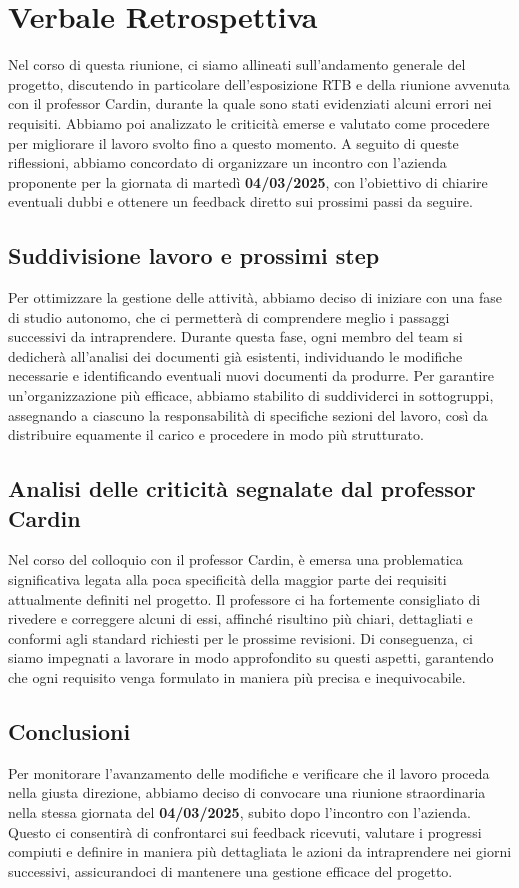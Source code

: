 \documentclass{article}
\begin{document}
\newpage
\section{Verbale Retrospettiva}
Nel corso di questa riunione, ci siamo allineati sull'andamento generale del progetto, discutendo in particolare dell'esposizione RTB e della riunione avvenuta con il professor Cardin, durante la quale sono stati evidenziati alcuni errori nei requisiti. Abbiamo poi analizzato le criticità emerse e valutato come procedere per migliorare il lavoro svolto fino a questo momento. A seguito di queste riflessioni, abbiamo concordato di organizzare un incontro con l'azienda proponente per la giornata di martedì \textbf{04/03/2025}, con l'obiettivo di chiarire eventuali dubbi e ottenere un feedback diretto sui prossimi passi da seguire.
\subsection{Suddivisione lavoro e prossimi step}
Per ottimizzare la gestione delle attività, abbiamo deciso di iniziare con una fase di studio autonomo, che ci permetterà di comprendere meglio i passaggi successivi da intraprendere. Durante questa fase, ogni membro del team si dedicherà all'analisi dei documenti già esistenti, individuando le modifiche necessarie e identificando eventuali nuovi documenti da produrre. Per garantire un'organizzazione più efficace, abbiamo stabilito di suddividerci in sottogruppi, assegnando a ciascuno la responsabilità di specifiche sezioni del lavoro, così da distribuire equamente il carico e procedere in modo più strutturato.
\subsection{Analisi delle criticità segnalate dal professor Cardin}
Nel corso del colloquio con il professor Cardin, è emersa una problematica significativa legata alla poca specificità della maggior parte dei requisiti attualmente definiti nel progetto. Il professore ci ha fortemente consigliato di rivedere e correggere alcuni di essi, affinché risultino più chiari, dettagliati e conformi agli standard richiesti per le prossime revisioni. Di conseguenza, ci siamo impegnati a lavorare in modo approfondito su questi aspetti, garantendo che ogni requisito venga formulato in maniera più precisa e inequivocabile.
\subsection{Conclusioni}
Per monitorare l'avanzamento delle modifiche e verificare che il lavoro proceda nella giusta direzione, abbiamo deciso di convocare una riunione straordinaria nella stessa giornata del \textbf{04/03/2025}, subito dopo l'incontro con l'azienda. Questo ci consentirà di confrontarci sui feedback ricevuti, valutare i progressi compiuti e definire in maniera più dettagliata le azioni da intraprendere nei giorni successivi, assicurandoci di mantenere una gestione efficace del progetto.
\end{document}
